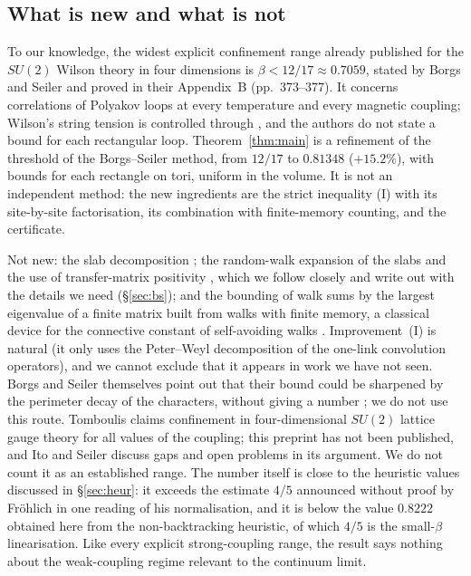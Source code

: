 \documentclass[11pt,a4paper]{article}
\theoremstyle{plain}
\theoremstyle{remark}
\numberwithin{equation}{section}
\begin{document}
\subsection{What is new and what is not}
To our knowledge, the widest explicit confinement range already published for the $SU(2)$ Wilson theory in four dimensions
is $\beta<12/17\approx0.7059$, stated by Borgs and Seiler \cite[(II.55), p.~343]{BS83} and proved in their Appendix~B (pp.~373--377).
It concerns correlations of Polyakov loops at every temperature and every magnetic coupling; Wilson's string tension is controlled through \cite[(II.50), p.~341]{BS83}, and the
authors do not state a bound for each rectangular loop. Theorem~\ref{thm:main} is a refinement of the threshold of the Borgs--Seiler
method, from $12/17$ to $0.81348$ ($+15.2\%$), with bounds for each rectangle on tori, uniform in the volume. It is not an independent
method: the new ingredients are the strict inequality (I) with its site-by-site factorisation, its combination with finite-memory
counting, and the certificate.

Not new: the slab decomposition \cite{DF80}; the random-walk expansion of the slabs and the use of transfer-matrix positivity
\cite{BS83}, which we follow closely and write out with the details we need (\S\ref{sec:bs}); and the bounding of walk sums by the
largest eigenvalue of a finite matrix built from walks with finite memory, a classical device for the connective constant of
self-avoiding walks \cite{Alm93,PT00}. Improvement~(I) is natural (it only uses the Peter--Weyl decomposition of the one-link
convolution operators), and we cannot exclude that it appears in work we have not seen. Borgs and Seiler themselves point out that
their bound could be sharpened by the perimeter decay of the characters, without giving a number \cite[p.~377]{BS83}; we do not use
this route. Tomboulis \cite{Tom07} claims confinement in four-dimensional $SU(2)$ lattice gauge theory for all values of the
coupling; this preprint has not been published, and Ito and Seiler \cite{IS08} discuss gaps and open problems in its argument. We do
not count it as an established range. The number itself is close to the
heuristic values discussed in \S\ref{sec:heur}: it exceeds the estimate $4/5$ announced without proof by Fr\"ohlich
\cite{Fro80a,Fro80b} in one reading of his normalisation, and it is below the value $0.8222$ obtained here from the non-backtracking
heuristic, of which $4/5$ is the small-$\beta$ linearisation. Like every explicit strong-coupling range, the result says nothing about the weak-coupling regime
relevant to the continuum limit.
\end{document}
